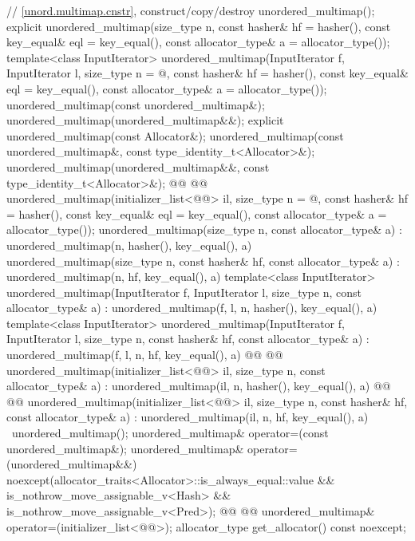 \documentclass{wg21}
\begin{document}
\begin{codeblock}
{{        // \ref{unord.multimap.cnstr}, construct/copy/destroy
        unordered_multimap();
        explicit unordered_multimap(size_type n,
        const hasher& hf = hasher(),
        const key_equal& eql = key_equal(),
        const allocator_type& a = allocator_type());
        template<class InputIterator>
        unordered_multimap(InputIterator f, InputIterator l,
        size_type n = @\seebelow@,
        const hasher& hf = hasher(),
        const key_equal& eql = key_equal(),
        const allocator_type& a = allocator_type());
        unordered_multimap(const unordered_multimap&);
        unordered_multimap(unordered_multimap&&);
        explicit unordered_multimap(const Allocator&);
        unordered_multimap(const unordered_multimap&, const type_identity_t<Allocator>&);
        unordered_multimap(unordered_multimap&&, const type_identity_t<Allocator>&);
        @@
        @@
        unordered_multimap(initializer_list<@@> il,
        size_type n = @\seebelow@,
        const hasher& hf = hasher(),
        const key_equal& eql = key_equal(),
        const allocator_type& a = allocator_type());
        unordered_multimap(size_type n, const allocator_type& a)
        : unordered_multimap(n, hasher(), key_equal(), a) { }
        unordered_multimap(size_type n, const hasher& hf, const allocator_type& a)
        : unordered_multimap(n, hf, key_equal(), a) { }
        template<class InputIterator>
        unordered_multimap(InputIterator f, InputIterator l, size_type n, const allocator_type& a)
        : unordered_multimap(f, l, n, hasher(), key_equal(), a) { }
        template<class InputIterator>
        unordered_multimap(InputIterator f, InputIterator l, size_type n, const hasher& hf,
        const allocator_type& a)
        : unordered_multimap(f, l, n, hf, key_equal(), a) { }
        @@
        @@
        unordered_multimap(initializer_list<@@> il, size_type n, const allocator_type& a)
        : unordered_multimap(il, n, hasher(), key_equal(), a) { }
        @@
        @@
        unordered_multimap(initializer_list<@@> il, size_type n, const hasher& hf,
        const allocator_type& a)
        : unordered_multimap(il, n, hf, key_equal(), a) { }
        ~unordered_multimap();
        unordered_multimap& operator=(const unordered_multimap&);
        unordered_multimap& operator=(unordered_multimap&&)
        noexcept(allocator_traits<Allocator>::is_always_equal::value &&
        is_nothrow_move_assignable_v<Hash> &&
        is_nothrow_move_assignable_v<Pred>);
        @@
        @@
        unordered_multimap& operator=(initializer_list<@@>);
        allocator_type get_allocator() const noexcept;
        
}}
\end{codeblock}
\end{document}
